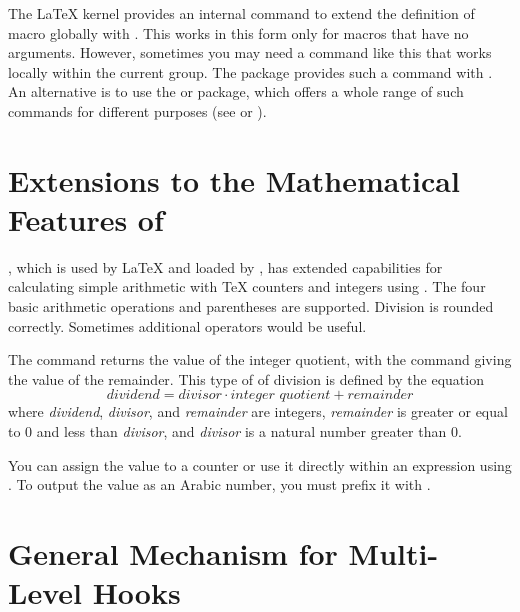 \begin{Declaration}
\end{Declaration}%
The \LaTeX{} kernel provides an internal command  to
extend the definition of macro  globally with
. This works in this form only for macros that have no
arguments. However, sometimes you may need a command like this that works
locally within the current group. The  package provides such
a command with . An alternative is to use the
 or
 package, which offers a whole range of
such commands for different purposes (see \cite{package:etoolbox} or
\cite{package:xpatch}).%
\EndIndexGroup


\section{Extensions to the Mathematical Features of \eTeX}

\eTeX{}, which is used by \LaTeX{} and loaded by \KOMAScript{}, has extended
capabilities for calculating simple arithmetic with \TeX{} counters and
integers using . The four basic arithmetic
operations and parentheses are supported. Division is rounded
correctly. Sometimes additional operators would be useful.

\begin{Declaration}
\end{Declaration}%
The  command returns the
value of the integer quotient, with the  command giving the value
of the remainder. This type of of division is defined by the equation
\[
\textit{dividend} = \textit{divisor} \cdot
\textit{integer quotient} + \textit{remainder}
\]
where \textit{dividend}, \textit{divisor}, and \textit{remainder} are
integers, \textit{remainder} is greater or equal to 0 and less than
\textit{divisor}, and \textit{divisor} is a natural number greater than 0.

You can assign the value to a counter or use it directly within an expression
using . To output the value as an Arabic number, you must
prefix it with .%
%
\EndIndexGroup


\section[{General Mechanism for Multi-Level Hooks}]
{General Mechanism for Multi-Level
  Hooks}

